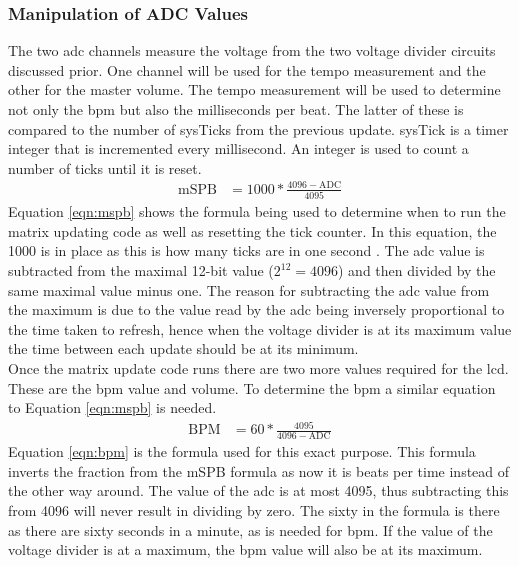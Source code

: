 \documentclass[12pt,a4paper]{report}
\begin{document}
\subsubsection{Manipulation of ADC Values}
The two \ac{adc} channels measure the voltage from the two voltage divider circuits discussed prior. One channel will be used for the tempo measurement and the other for the master volume. The tempo measurement will be used to determine not only the \ac{bpm} but also the milliseconds per beat. The latter of these is compared to the number of sysTicks from the previous update. sysTick is a timer integer that is incremented every millisecond. An integer is used to count a number of ticks until it is reset. 
\begin{equation}
\label{eqn:mspb}
\begin{aligned}
\text{mSPB} &= 1000 * \frac{4096 - \text{ADC}}{4095}
\end{aligned}
\end{equation}
Equation \ref{eqn:mspb} shows the formula being used to determine when to run the matrix updating code as well as resetting the tick counter. In this equation, the 1000 is in place as this is how many ticks are in one second \cite{f411}. The \ac{adc} value is subtracted from the maximal 12-bit value ($2^{12} = 4096$) and then divided by the same maximal value minus one. The reason for subtracting the \ac{adc} value from the maximum is due to the value read by the \ac{adc} being inversely proportional to the time taken to refresh, hence when the voltage divider is at its maximum value the time between each update should be at its minimum.\\
Once the matrix update code runs there are two more values required for the \ac{lcd}. These are the \ac{bpm} value and volume. To determine the \ac{bpm} a similar equation to Equation \ref{eqn:mspb} is needed. 
\begin{equation}
	\label{eqn:bpm}
	\begin{aligned}
	\text{BPM} &= 60 * \frac{4095}{4096 - \text{ADC}}
	\end{aligned}
\end{equation}
Equation \ref{eqn:bpm} is the formula used for this exact purpose. This formula inverts the fraction from the mSPB formula as now it is beats per time instead of the other way around. The value of the \ac{adc} is at most 4095, thus subtracting this from 4096 will never result in dividing by zero. The sixty in the formula is there as there are sixty seconds in a minute, as is needed for \acl{bpm}. If the value of the voltage divider is at a maximum, the \ac{bpm} value will also be at its maximum. 
\end{document}
